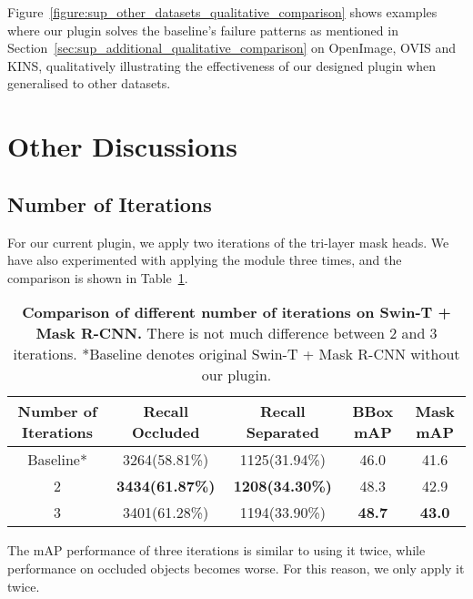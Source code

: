 \documentclass{bmvc2k}
\begin{document}
Figure~\ref{figure:sup_other_datasets_qualitative_comparison} shows examples where our plugin solves the baseline's failure patterns as mentioned in Section~\ref{sec:sup_additional_qualitative_comparison} on OpenImage, OVIS and KINS, qualitatively illustrating the effectiveness of our designed plugin when generalised to other datasets.


\clearpage



\section{Other Discussions}
\label{sec:sup_other_discussion}

\subsection{Number of Iterations}
\label{sec:sup_other_discussion_iteration}

For our current plugin, we apply two iterations of the tri-layer mask heads. We have also experimented with applying the module  three
times, and the comparison is shown in Table~\ref{table:sup_discussion_iteration}.


\begin{table}[!htb]

\centering
\begin{tabular}{ccccc}
\toprule
  Number of Iterations & Recall Occluded & Recall Separated & BBox mAP & Mask mAP  \\ \midrule
  Baseline* & 3264(58.81\%) & 1125(31.94\%) & 46.0 & 41.6 \\
  2 & \textbf{3434(61.87\%)} & \textbf{1208(34.30\%)} & 48.3 & 42.9 \\ 
  3 & 3401(61.28\%) & 1194(33.90\%) & \textbf{48.7} & \textbf{43.0}  \\ \bottomrule
\end{tabular}
\vspace{.4cm}
\caption{\color{bmvc_blue} \textbf{Comparison of different number of iterations on Swin-T + Mask R-CNN.} There is not much difference between 2 and 3 iterations. *Baseline denotes original Swin-T + Mask R-CNN without our plugin.}
\label{table:sup_discussion_iteration}
\end{table}


The mAP performance of three iterations is similar to using it twice, while
performance on occluded objects becomes worse.
For this reason, we only apply it twice.
\end{document}
